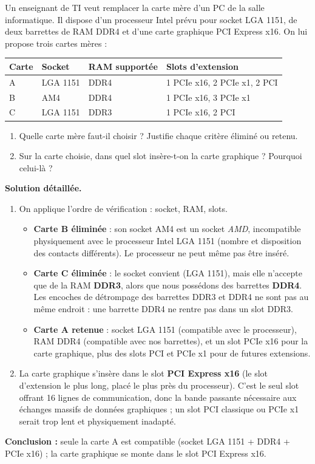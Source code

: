\documentclass[11pt]{article}
\begin{document}
\begin{exoresolu}
Un enseignant de TI veut remplacer la carte mère d'un PC de la salle informatique. Il dispose d'un processeur Intel prévu pour socket LGA 1151, de deux barrettes de RAM DDR4 et d'une carte graphique PCI Express x16. On lui propose trois cartes mères :
\begin{center}
\begin{tabularx}{\linewidth}{|l|X|X|X|}
\hline
\rowcolor{popblueL} \textbf{Carte} & \textbf{Socket} & \textbf{RAM supportée} & \textbf{Slots d'extension} \\
\hline
A & LGA 1151 & DDR4 & 1 PCIe x16, 2 PCIe x1, 2 PCI \\
\hline
B & AM4 & DDR4 & 1 PCIe x16, 3 PCIe x1 \\
\hline
C & LGA 1151 & DDR3 & 1 PCIe x16, 2 PCI \\
\hline
\end{tabularx}
\end{center}
\begin{enumerate}
\item Quelle carte mère faut-il choisir ? Justifie chaque critère éliminé ou retenu.
\item Sur la carte choisie, dans quel slot insère-t-on la carte graphique ? Pourquoi celui-là ?
\end{enumerate}
\tcblower
\textbf{Solution détaillée.}
\begin{enumerate}
\item On applique l'ordre de vérification : socket, RAM, slots.
\begin{itemize}
\item \textbf{Carte B éliminée} : son socket AM4 est un socket \emph{AMD}, incompatible physiquement avec le processeur Intel LGA 1151 (nombre et disposition des contacts différents). Le processeur ne peut même pas être inséré.
\item \textbf{Carte C éliminée} : le socket convient (LGA 1151), mais elle n'accepte que de la RAM \textbf{DDR3}, alors que nous possédons des barrettes \textbf{DDR4}. Les encoches de détrompage des barrettes DDR3 et DDR4 ne sont pas au même endroit : une barrette DDR4 ne rentre pas dans un slot DDR3.
\item \textbf{Carte A retenue} : socket LGA 1151 (compatible avec le processeur), RAM DDR4 (compatible avec nos barrettes), et un slot PCIe x16 pour la carte graphique, plus des slots PCI et PCIe x1 pour de futures extensions.
\end{itemize}
\item La carte graphique s'insère dans le slot \textbf{PCI Express x16} (le slot d'extension le plus long, placé le plus près du processeur). C'est le seul slot offrant 16 lignes de communication, donc la bande passante nécessaire aux échanges massifs de données graphiques ; un slot PCI classique ou PCIe x1 serait trop lent et physiquement inadapté.
\end{enumerate}
\textbf{Conclusion :} seule la carte A est compatible (socket LGA 1151 + DDR4 + PCIe x16) ; la carte graphique se monte dans le slot PCI Express x16.
\end{exoresolu}
\end{document}
